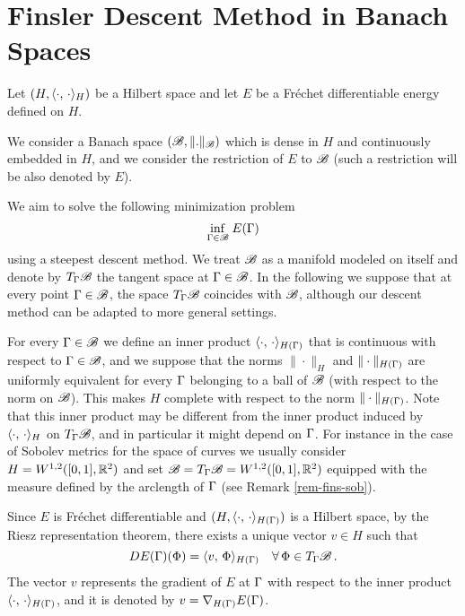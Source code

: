 \section{Finsler Descent Method in Banach Spaces}\label{F}

Let   $(H, \langle \cdot,\,\cdot\rangle_{H})$ be  a Hilbert space and let $E$ be a Fr\'echet differentiable energy defined on $H$.

We consider a  Banach space $(\mathcal{B}, \|.\|_{\mathcal{B}})$  which is dense in $H$ and continuously embedded in $H$, and we consider the restriction of  $E$ to $\mathcal{B}$ (such a restriction will be also denoted by $E$). 

We aim to solve the following minimization problem
\begin{equation}\label{initial-eq}
	\underset{\Gamma\in \mathcal{B}}{\inf}\; E(\Gamma)
\end{equation}
using a steepest descent method. We treat $\mathcal{B}$ as a manifold modeled on itself and denote  by $T_\Gamma \mathcal{B}$ the tangent space at $\Gamma \in \mathcal{B}$. In the following we suppose that at every point $\Gamma\in \mathcal{B}$, the space $T_\Gamma \mathcal{B}$ coincides with $\mathcal{B}$, although our descent method can be adapted to more general settings. 

For every $\Gamma\in \mathcal{B}$  we define an inner product  $\langle \cdot,\,\cdot\rangle_{H(\Gamma)}$ that is continuous with respect to  $\Gamma \in \mathcal{B}$, and we suppose that the norms $\|\cdot\|_H$ and $\|\cdot\|_{H(\Gamma)}$ are uniformly equivalent for every $\Gamma$  belonging to a ball of $\mathcal{B}$ (with respect to the norm on $\mathcal{B}$). This makes $H$ complete with respect to the norm $\|\cdot\|_{H(\Gamma)}$. 
Note that this inner product may be different from the inner product induced by $\langle \cdot,\,\cdot\rangle_H$ on $T_\Gamma \mathcal{B}$, and in particular it might depend on $\Gamma$. For instance in the case of Sobolev metrics for the space of curves we usually consider $H= W^{1,2}([0,1],\mathbb{R}^2)$ and set $\mathcal{B}=T_\Gamma \mathcal{B}= W^{1,2}([0,1],\mathbb{R}^2)$ equipped with the measure defined by the arclength of $\Gamma$ (see Remark \ref{rem-fins-sob}).

Since $E$ is Fr\'echet differentiable and $(H, \langle \cdot,\,\cdot\rangle_{H(\Gamma)})$ is a Hilbert space, by the Riesz representation theorem,  there exists a unique vector  
$v\in H$ such that
$$D E(\Gamma)(\Phi) = \langle v,\,\Phi\rangle_{H(\Gamma)}\quad \forall \,\Phi\in T_\Gamma \mathcal{B}\,.$$
The vector $v$ represents  
the gradient of $E$ at $\Gamma$ with respect to the inner product $\langle \cdot,\,\cdot\rangle_{H(\Gamma)}$, and it  is denoted by $v=\nabla_{H(\Gamma)} E(\Gamma)$. 


